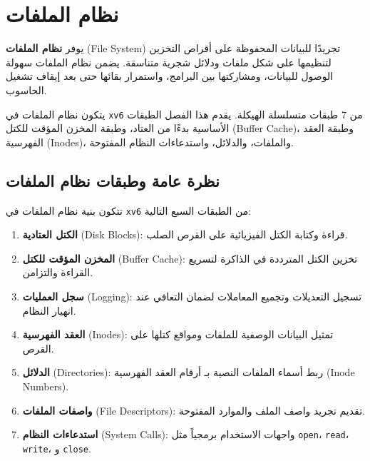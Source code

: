 \chapter{نظام الملفات}
\label{CH:FS}

يوفر \textbf{نظام الملفات} (File System) تجريدًا للبيانات المحفوظة على أقراص التخزين لتنظيمها على شكل ملفات ودلائل شجرية متناسقة.
يضمن نظام الملفات سهولة الوصول للبيانات، ومشاركتها بين البرامج، واستمرار بقائها حتى بعد إيقاف تشغيل الحاسوب.

يتكون نظام الملفات في \texttt{xv6} من 7 طبقات متسلسلة الهيكلة.
يقدم هذا الفصل الطبقات الأساسية بدءًا من العتاد، وطبقة المخزن المؤقت للكتل (Buffer Cache)، وطبقة العقد الفهرسية (Inodes)، والملفات، والدلائل، واستدعاءات النظام المفتوحة.

\section{نظرة عامة وطبقات نظام الملفات}
\label{sec:fs_overview}

تتكون بنية نظام الملفات في \texttt{xv6} من الطبقات السبع التالية:
\begin{enumerate}
  \item \textbf{الكتل العتادية} (Disk Blocks): قراءة وكتابة الكتل الفيزيائية على القرص الصلب.
  \item \textbf{المخزن المؤقت للكتل} (Buffer Cache): تخزين الكتل المترددة في الذاكرة لتسريع القراءة والتزامن.
  \item \textbf{سجل العمليات} (Logging): تسجيل التعديلات وتجميع المعاملات لضمان التعافي عند انهيار النظام.
  \item \textbf{العقد الفهرسية} (Inodes): تمثيل البيانات الوصفية للملفات ومواقع كتلها على القرص.
  \item \textbf{الدلائل} (Directories): ربط أسماء الملفات النصية بـ أرقام العقد الفهرسية (Inode Numbers).
  \item \textbf{واصفات الملفات} (File Descriptors): تقديم تجريد واصف الملف والموارد المفتوحة.
  \item \textbf{استدعاءات النظام} (System Calls): واجهات الاستخدام برمجياً مثل \texttt{open}، \texttt{read}، \texttt{write}، و \texttt{close}.
\end{enumerate}

